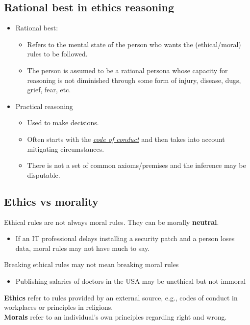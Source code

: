 \documentclass{article}
\newcommand{\worddef}[1]{\hyperref[sec:reference]{\textit{#1}}}
\begin{document}
\subsection{Rational best in ethics reasoning}
\begin{itemize}
  \item Rational best:
  \begin{itemize}
    \item Refers to the mental state of the person who wants the (ethical/moral) rules to be followed.
    \item The person is assumed to be a rational persona whose capacity for reasoning is
not diminished through some form of injury, disease, dugs, grief, fear, etc. 
  \end{itemize}
  \item Practical reasoning
  \begin{itemize}
    \item Used to make decisions.
    \item Often starts with the \worddef{code of conduct} and then takes into account mitigating circumstances.
    \item There is not a set of common axioms/premises and the inference may be disputable.  
  \end{itemize}
\end{itemize}

\subsection{Ethics vs morality}

\begin{flushleft}
Ethical rules are not always moral rules. They can be morally \textbf{neutral}.
\begin{itemize}
  \item If an IT professional delays installing a security patch and a person loses data, moral rules may not have much to say.
\end{itemize}
Breaking ethical rules may not mean breaking moral rules
\begin{itemize}
  \item Publishing salaries of doctors in the USA may be unethical but not immoral
\end{itemize}
\textbf{Ethics} refer to rules provided by an external source, e.g., codes of conduct in workplaces or principles in religions.\\ \textbf{Morals} refer to an individual’s own principles regarding right and wrong.

\end{flushleft}
\end{document}
